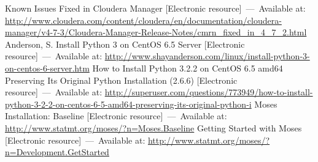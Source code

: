 \renewcommand{\bibname}{Список использованных источников}
\begin{thebibliography}{10}
     Known Issues Fixed in Cloudera Manager
        [Electronic resource]~---~Available at:
        \url{http://www.cloudera.com/content/cloudera/en/documentation/cloudera-manager/v4-7-3/Cloudera-Manager-Release-Notes/cmrn_fixed_in_4_7_2.html}
     Anderson, S. Install Python 3 on CentOS 6.5 Server
        [Electronic resource]~---~Available at: 
        \url{http://www.shayanderson.com/linux/install-python-3-on-centos-6-server.htm}
     How to Install Python 3.2.2 on CentOS 6.5 amd64 Preserving Its Original 
        Python Installation (2.6.6) [Electronic resource]~---~Available at:
        \url{http://superuser.com/questions/773949/how-to-install-python-3-2-2-on-centos-6-5-amd64-preserving-its-original-python-i}
     Moses Installation: Baseline [Electronic resource]~---~Available at:
        \url{http://www.statmt.org/moses/?n=Moses.Baseline}
     Getting Started with Moses [Electronic resource]~---~Available at:
        \url{http://www.statmt.org/moses/?n=Development.GetStarted}
\end{thebibliography}